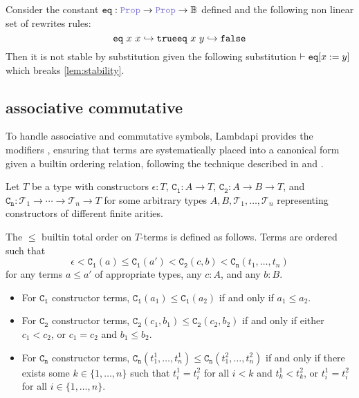 \begin{example}
Consider the constant $\kw{eq}: \prop \ra \prop \ra \B$ defined  and the following non linear set of rewrites rules:
\[
    \texttt{\upshape{eq}}~x~x \hookrightarrow \texttt{\upshape{true}}\\
    \texttt{\upshape{eq}}~x~y \hookrightarrow \texttt{\upshape{false}}
\]
Then it is not stable by substitution given the following substitution $\vdash\texttt{\upshape{eq}}[x := y]$ which breaks \cref{lem:stability}.
\end{example}

\subsection{associative commutative}

To handle associative and commutative symbols, Lambdapi provides the modifiers ,
ensuring that terms are systematically placed into a canonical form given a builtin ordering relation, following the technique described in \cite{ACorigin} and \cite[\S 5]{univAC}.

\begin{definition}\label{def:builtin-order-relation}
Let $T$ be a type with constructors $\epsilon : T$, $\mathtt{C_1} : A \to T$, $\mathtt{C_2} : A \to B \to T$, and $\mathtt{C_n} : \mathcal{T}_1 \to \cdots \to \mathcal{T}_n \to T$ for some arbitrary types $A, B, \mathcal{T}_1, \ldots, \mathcal{T}_n$ representing constructors of different finite arities.

The $\leq$ builtin total order on $T$-terms is defined as follows. Terms are ordered such that
\[
  \epsilon < \mathtt{C_1}(a) \leq \mathtt{C_1}(a') < \mathtt{C_2}(c, b) < \mathtt{C_n}(t_1, \ldots, t_n)
\]
for any terms $a \leq a'$ of appropriate types, any $c : A$, and any $b : B$.

\begin{itemize}
\item For $\mathtt{C_1}$ constructor terms, $\mathtt{C_1}(a_1) \leq \mathtt{C_1}(a_2)$ if and only if $a_1 \leq a_2$.

  \item For $\mathtt{C_2}$ constructor terms, $\mathtt{C_2}(c_1, b_1) \leq \mathtt{C_2}(c_2, b_2)$ if and only if either $c_1 < c_2$, or $c_1 = c_2$ and $b_1 \leq b_2$.

  \item For $\mathtt{C_n}$ constructor terms, $\mathtt{C_n}(t_1^{1}, \ldots, t_n^{1}) \leq \mathtt{C_n}(t_1^{2}, \ldots, t_n^{2})$ if and only if there exists some $k \in \{1, \ldots, n\}$ such that $t_i^{1} = t_i^{2}$ for all $i < k$ and $t_k^{1} < t_k^{2}$, or $t_i^{1} = t_i^{2}$ for all $i \in \{1, \ldots, n\}$.
\end{itemize}
\end{definition}

